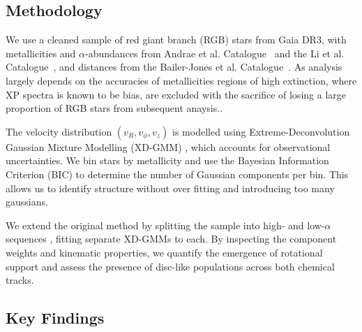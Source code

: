 \documentclass[a4paper,10pt]{article}
\begin{document}
\begin{multicols}{2}
\subsection*{Methodology}

We use a cleaned sample of red giant branch (RGB) stars from Gaia DR3, with metallicities and $\alpha$-abundances from Andrae et 
al. Catalogue~\cite{Andrae2023} and the Li et al. Catalogue~\cite{Li2024}, and distances from the Bailer-Jones et al. 
Catalogue~\cite{BailerJones2021}. As analysis largely depends on the accuracies of metallicities regions of high extinction, 
where XP spectra is known to be bias, are excluded with the sacrifice of losing a large proportion of RGB stars from subsequent anaysis..

The velocity distribution $(v_R, v_\phi, v_z)$ is modelled using Extreme-Deconvolution Gaussian Mixture Modelling (XD-GMM) \cite{Bovy2011}\cite{pygmmis}, 
which accounts for observational uncertainties. We bin stars by metallicity and use the Bayesian Information Criterion (BIC) to determine the 
number of Gaussian components per bin. This allows us to identify structure without over fitting and introducing too many gaussians.


We extend the original method by splitting the sample into high- and low-$\alpha$ sequences \citep{Vis2024}, fitting separate 
XD-GMMs to each. By inspecting the component weights and kinematic properties, we quantify the emergence of rotational support 
and assess the presence of disc-like populations across both chemical tracks.

\subsection*{Key Findings}


\begin{figure}[H]
  \centering


\end{figure}
\end{multicols}
\end{document}
